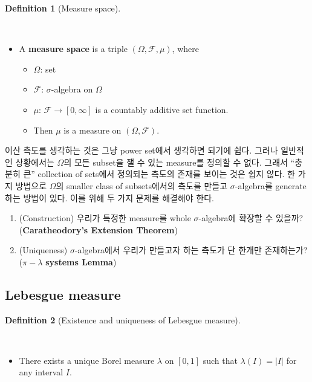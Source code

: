 \documentclass[
  13pt,
  letterpaper,
  DIV=11,
  numbers=noendperiod]{scrreprt}
\providecommand{\tightlist}{%
  \setlength{\itemsep}{0pt}\setlength{\parskip}{0pt}}\usepackage{longtable,booktabs,array}
\theoremstyle{plain}
\theoremstyle{definition}
\theoremstyle{definition}
\newtheorem{definition}{Definition}[chapter]
\theoremstyle{plain}
\theoremstyle{definition}
\theoremstyle{plain}
\theoremstyle{remark}
\begin{document}
\begin{definition}[Measure
space]\protect\hypertarget{def-measurespace}{}\label{def-measurespace}

~

\begin{itemize}
\tightlist
\item
  A \textbf{measure space} is a triple \((\Omega, \mathcal{F}, \mu)\),
  where

  \begin{itemize}
  \tightlist
  \item
    \(\Omega\): set
  \item
    \(\mathcal{F}\): \(\sigma\)-algebra on \(\Omega\)
  \item
    \(\mu\): \(\mathcal{F} \rightarrow [0,\infty]\) is a countably
    additive set function.
  \item
    Then \(\mu\) is a measure on \((\Omega, \mathcal{F})\).
  \end{itemize}
\end{itemize}

\end{definition}

이산 측도를 생각하는 것은 그냥 power set에서 생각하면 되기에 쉽다.
그러나 일반적인 상황에서는 \(\Omega\)의 모든 subset을 잴 수 있는
measure를 정의할 수 없다. 그래서 ``충분히 큰'' collection of sets에서
정의되는 측도의 존재를 보이는 것은 쉽지 않다. 한 가지 방법으로
\(\Omega\)의 smaller class of subsets에서의 측도를 만들고
\(\sigma\)-algebra를 generate하는 방법이 있다. 이를 위해 두 가지 문제를
해결해야 한다.

\begin{enumerate}
\def\labelenumi{\arabic{enumi}.}
\item
  (Construction) 우리가 특정한 measure를 whole \(\sigma\)-algebra에
  확장할 수 있을까? (\textbf{Caratheodory's Extension Theorem})
\item
  (Uniqueness) \(\sigma\)-algebra에서 우리가 만들고자 하는 측도가 단
  한개만 존재하는가? (\(\pi-\lambda\) \textbf{systems Lemma})
\end{enumerate}

\subsection{Lebesgue measure}\label{lebesgue-measure}

\begin{definition}[Existence and uniqueness of Lebesgue
measure]\protect\hypertarget{def-existenceuniquenessLebesgue}{}\label{def-existenceuniquenessLebesgue}

~

\begin{itemize}
\tightlist
\item
  There exists a unique Borel measure \(\lambda\) on \([0,1]\) such that
  \(\lambda (I) = \vert I \vert\) for any interval \(I\).
\end{itemize}

\end{definition}
\end{document}
